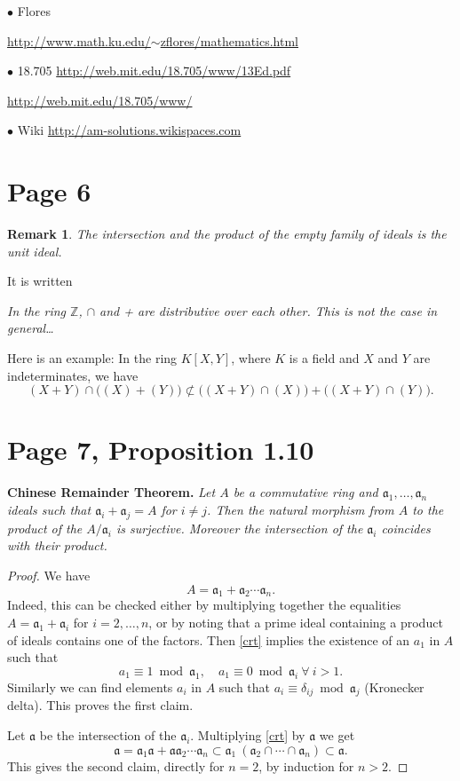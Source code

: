 \documentclass[12pt]{article}
\newcommand{\mf}{\mathfrak}
\newcommand{\aaa}{\mf a}
\newcommand{\bu}{\bullet}
\newtheorem{rk}[thm]{Remark}
\begin{document}
$\bu$ Flores 

\href{http://www.math.ku.edu/~zflores/mathematics.html}{http://www.math.ku.edu/$\sim$zflores/mathematics.html}

$\bu$ 18.705 \href{http://web.mit.edu/18.705/www/13Ed.pdf}{http://web.mit.edu/18.705/www/13Ed.pdf}

\href{http://web.mit.edu/18.705/www/}{http://web.mit.edu/18.705/www/}

$\bu$ Wiki \href{http://am-solutions.wikispaces.com}{http://am-solutions.wikispaces.com}

\section{Page 6}%

\begin{rk}\label{ef}
The intersection and the product of the empty family of ideals is the unit ideal.
\end{rk}

It is written

\emph{In the ring $\mathbb Z$, $\cap$ and + are distributive over each other. This is not the case in general\dots}

Here is an example: In the ring $K[X,Y]$, where $K$ is a field and $X$ and $Y$ are indeterminates, we have 
$$
(X+Y)\cap\Big((X)+(Y)\Big)\not\subset\Big((X+Y)\cap (X)\Big)+\Big((X+Y)\cap (Y)\Big).
$$

\section{Page 7, Proposition 1.10}%

\textbf{Chinese Remainder Theorem.} \emph{Let $A$ be a commutative ring and $\aaa_1,\dots,\aaa_n$ ideals such that $\aaa_i+\aaa_j=A$ for $i\not=j$. Then the natural morphism from $A$ to the product of the $A/\aaa_i$ is surjective. Moreover the intersection of the $\aaa_i$ coincides with their product.}

\begin{proof} 
We have
\begin{equation}\label{crt}
A=\aaa_1+\aaa_2\cdots\aaa_n.
\end{equation}
Indeed, this can be checked either by multiplying together the equalities $A=\aaa_1+\aaa_i$ for $i=2,\dots,n$, or by noting that a prime ideal containing a product of ideals contains one of the factors. Then \eqref{crt} implies the existence of an $a_1$ in $A$ such that
$$
a_1\equiv1\bmod\aaa_1,\quad a_1\equiv0\bmod \aaa_i\ \forall\ i > 1.
$$
Similarly we can find elements $a_i$ in $A$ such that $a_i\equiv\delta_{ij}\bmod \aaa_j$ (Kronecker delta). This proves the first claim.

Let $\aaa$ be the intersection of the $\aaa_i$. Multiplying \eqref{crt} by $\aaa$ we get
$$
\aaa=
\aaa_1\aaa+
\aaa\aaa_2\cdots\aaa_n\subset
\aaa_1\ (\aaa_2\cap\cdots \cap \aaa_n)\subset \aaa.
$$
This gives the second claim, directly for $n=2$, by induction for $n>2$. 
\end{proof}
\end{document}
